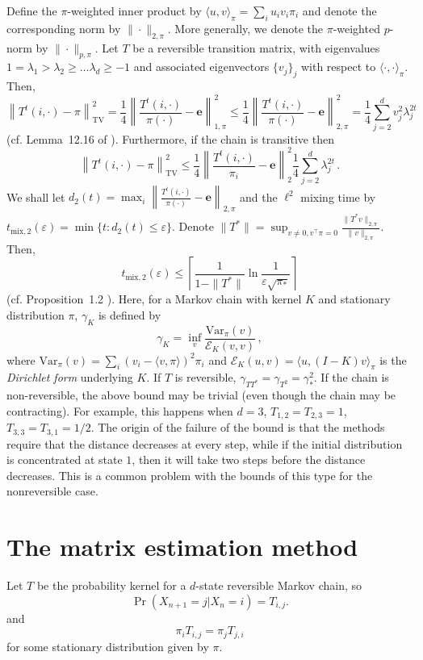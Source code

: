\documentclass[11pt]{article}
\newcommand{\ceil}[1]{\left \lceil {#1} \right\rceil}
\newcommand{\eps}{\varepsilon}
\theoremstyle{plain}
\theoremstyle{definition}
\theoremstyle{remark}
\newcommand\norm[1]{\| #1 \|}
\newcommand\Norm[1]{\left\| #1 \right\|}
\newcommand\tvnorm[1]{\left\| #1 \right\|_{\mathrm{TV}}}
\newcommand\be{\ensuremath{\mathbf{e}}}
\newcommand{\ip}[1]{\langle#1\rangle}
\newcommand{\DF}{\mathcal{E}}
\newcommand\ttmix{\ensuremath{t_{\mathrm{mix},2}}}
\begin{document}
Define the $\pi$-weighted inner product by $\ip{u,v}_{\pi} = \sum_i u_i v_i \pi_i$ and denote the corresponding norm by $\norm{\cdot}_{2,\pi}$. More generally, we denote the $\pi$-weighted $p$-norm by $\norm{\cdot}_{p,\pi}$.
Let $T$ be a reversible transition matrix, with eigenvalues $1 = \lambda_1 > \lambda_2 \ge \ldots \lambda_d \ge -1$ and associated eigenvectors $\{v_j\}_j$ with respect to $\ip{\cdot,\cdot}_\pi$. Then,
\[
\tvnorm{ T^t(i,\cdot) - \pi}^2 
= \frac14  \Norm{\frac{T^t(i,\cdot)}{\pi(\cdot)} - \be }_{1,\pi}^2  
\le \frac14  \Norm{\frac{T^t(i,\cdot)}{\pi(\cdot)} - \be }_{2,\pi}^2
= \frac14 \sum_{j=2}^d v_j^2 \lambda_j^{2t}\,
\]
(cf. Lemma~12.16 of \citet{LePeWi08}).
Furthermore, if the chain is transitive then 
\[
\tvnorm{ T^t(i,\cdot) - \pi}^2 \le \frac14  \Norm{\frac{T^t(i,\cdot)}{\pi_i} - \be }_2^2 \frac14 \sum_{j=2}^d \lambda_j^{2t}\,.
\]
\fi
We shall let $d_2(t) =  \max_i \Norm{\frac{T^t(i,\cdot)}{\pi(\cdot)} - \be }_{2,\pi}$ and the $\ell^2$ mixing time by $\ttmix(\eps) = \min\{ t: d_2(t)\le \eps\}$.
Denote $\norm{T^*} = \sup_{v\ne 0, v^\top \pi = 0} \frac{\norm{T^* v}_{2,\pi}}{\norm{v}_{2,\pi}}$.
Then, 
\[
\ttmix(\eps) \le \ceil{ \frac{1}{1-\norm{T^*}} \ln \frac{1}{\eps\sqrt{\pi_*}}} 
\]
(cf. Proposition~1.2 \citet{MoTe06}). 
Here, for a Markov chain with kernel $K$ and stationary distribution $\pi$,
 $\gamma_{K}$ is defined by
\[
\gamma_{K} = \inf_v \frac{\mathrm{Var}_\pi(v)}{\DF_K(v,v)}\,,
\]
where $\mathrm{Var}_\pi(v) = \sum_i (v_i - \ip{v,\pi})^2 \pi_i$ and
$\DF_K(u,v) = \ip{ u, (I-K)v }_\pi$ is the \emph{Dirichlet form} underlying $K$.
If $T$ is reversible, $\gamma_{T T^*} =\gamma_{T^2} = \gamma_*^2$.
\fi
If the chain is non-reversible, the above bound may be trivial (even though the chain may be contracting). For example, this happens when $d = 3$, $T_{1,2} = T_{2,3} = 1$, $T_{3,3} = T_{3,1} = 1/2$. The origin of the failure of the bound is that the methods require that the distance decreases at every step, while if the initial distribution is concentrated at state $1$, then it will take two steps before the distance decreases. This is a common problem with the bounds of this type for the nonreversible case.

\section{The matrix estimation method}

Let $T$ be the probability kernel for a $d$-state reversible Markov
chain, so
\[ \Pr(X_{n+1} = j | X_n = i) = T_{i,j} . \]
and
\[
  \pi_i T_{i,j} = \pi_j T_{j,i}
\]
for some stationary distribution given by $\pi$.
\end{document}
